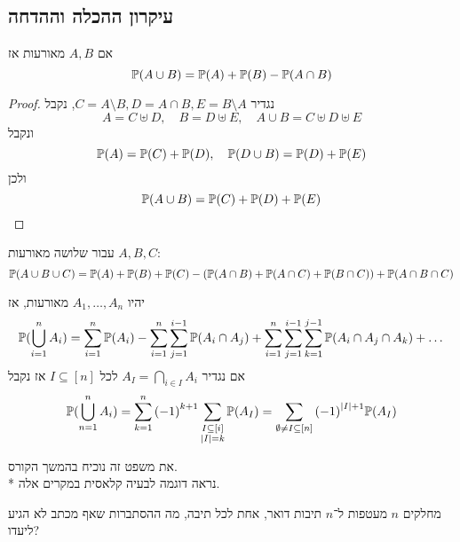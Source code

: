 \subsection{עיקרון ההכלה וההדחה}
\begin{proposition}
	אם $A, B$ מאורעות אז
	\[
		\mathbb{P}(A \cup B) = \mathbb{P}(A) + \mathbb{P}(B) - \mathbb{P}(A \cap B)
	\]
\end{proposition}
\begin{proof}
	נגדיר $C = A \setminus B, D = A \cap B, E = B \setminus A$, נקבל
	\[
		A = C \uplus D,
		\quad
		B = D \uplus E,
		\quad
		A \cup B = C \uplus D \uplus E
	\]
	ונקבל
	\[
		\mathbb{P}(A) = \mathbb{P}(C) + \mathbb{P}(D),
		\quad
		\mathbb{P}(D \cup B) = \mathbb{P}(D) + \mathbb{P}(E)
	\]
	ולכן
	\[
		\mathbb{P}(A \cup B) = \mathbb{P}(C) + \mathbb{P}(D) + \mathbb{P}(E)
	\]
\end{proof}
\begin{theorem}
	עבור שלושה מאורעות $A, B, C$:
	\[
		\mathbb{P}(A \cup B \cup C) = \mathbb{P}(A) + \mathbb{P}(B) + \mathbb{P}(C) - (\mathbb{P}(A \cap B) + \mathbb{P}(A \cap C) + \mathbb{P}(B \cap C)) + \mathbb{P}(A \cap B \cap C)
	\]
\end{theorem}
\begin{theorem}
	יהיו $A_1, \dots, A_n$ מאורעות, אז
	\[
		\mathbb{P}(\bigcup_{i = 1}^n A_i)
		= \sum_{i = 1}^{n} \mathbb{P}(A_i) - \sum_{i = 1}^{n} \sum_{j = 1}^{i - 1} \mathbb{P}(A_i \cap A_j) + \sum_{i = 1}^{n} \sum_{j = 1}^{i - 1} \sum_{k = 1}^{j - 1} \mathbb{P}(A_i \cap A_j \cap A_k) + \dots
	\]
	אם נגדיר $A_I = \bigcap_{i \in I} A_i$ לכל $I \subseteq [n]$ אז נקבל
	\[
		\mathbb{P}(\bigcup_{n = 1}^n A_i)
		= \sum_{k = 1}^{n} {(-1)}^{k + 1} \sum_{\substack{I \subseteq [i] \\ |I| = k}} \mathbb{P}(A_I)
		= \sum_{\emptyset \ne I \subseteq [n]} {(-1)}^{|I| + 1} \mathbb{P}(A_I)
	\]
\end{theorem}
את משפט זה נוכיח בהמשך הקורס. \\*
נראה דוגמה לבעיה קלאסית במקרים אלה.
\begin{exercise}
	מחלקים $n$ מעטפות ל־$n$ תיבות דואר, אחת לכל תיבה, מה ההסתברות שאף מכתב לא הגיע ליעדו?
\end{exercise}

